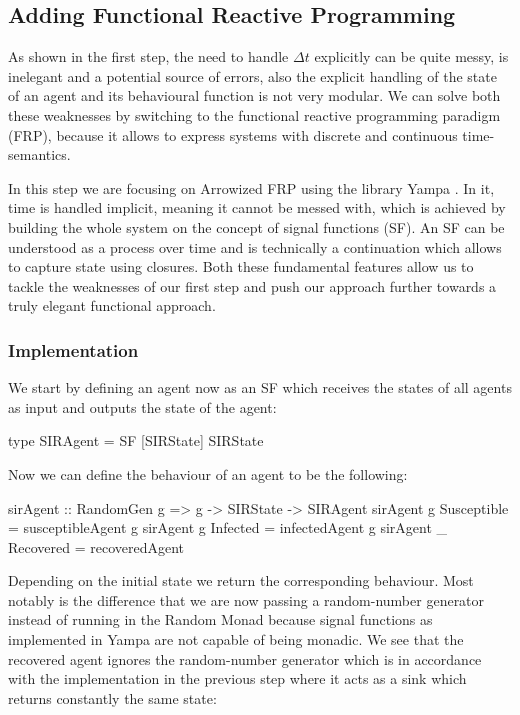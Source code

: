 \subsection{Adding Functional Reactive Programming}
\label{sec:step2_frp}
As shown in the first step, the need to handle $\Delta t$ explicitly can be quite messy, is inelegant and a potential source of errors, also the explicit handling of the state of an agent and its behavioural function is not very modular. We can solve both these weaknesses by switching to the functional reactive programming paradigm (FRP), because it allows to express systems with discrete and continuous time-semantics.

In this step we are focusing on Arrowized FRP \cite{hughes_generalising_2000} using the library Yampa \cite{hudak_arrows_2003}. In it, time is handled implicit, meaning it cannot be messed with, which is achieved by building the  whole system on the concept of signal functions (SF). An SF can be understood as a process over time and is technically a continuation which allows to capture state using closures. Both these fundamental features allow us to tackle the weaknesses of our first step and push our approach further towards a truly elegant functional approach.

\subsubsection{Implementation}
We start by defining an agent now as an SF which receives the states of all agents as input and outputs the state of the agent:

\begin{HaskellCode}
type SIRAgent = SF [SIRState] SIRState 
\end{HaskellCode}

Now we can define the behaviour of an agent to be the following:

\begin{HaskellCode}
sirAgent :: RandomGen g => g -> SIRState -> SIRAgent
sirAgent g Susceptible = susceptibleAgent g
sirAgent g Infected    = infectedAgent g
sirAgent _ Recovered   = recoveredAgent
\end{HaskellCode}

Depending on the initial state we return the corresponding behaviour. Most notably is the difference that we are now passing a random-number generator instead of running in the Random Monad because signal functions as implemented in Yampa are not capable of being monadic. We see that the recovered agent ignores the random-number generator which is in accordance with the implementation in the previous step where it acts as a sink which returns constantly the same state:

